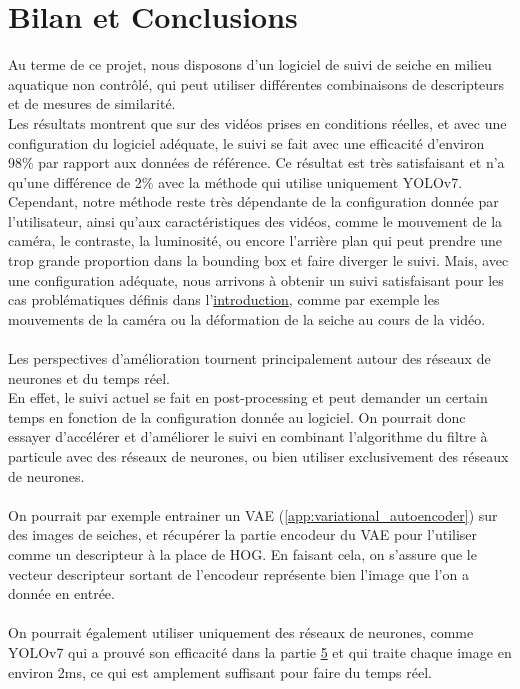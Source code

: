 \pagestyle{plain}
\chapter{Bilan et Conclusions}
Au terme de ce projet, nous disposons d'un logiciel de suivi de seiche en milieu aquatique non contrôlé, qui peut utiliser différentes combinaisons de descripteurs et de mesures de similarité.\\
Les résultats montrent que sur des vidéos prises en conditions réelles, et avec une configuration du logiciel adéquate, le suivi se fait avec une efficacité d'environ 98\% par rapport aux données de référence. Ce résultat est très satisfaisant et n'a qu'une différence de 2\% avec la méthode qui utilise uniquement YOLOv7.\\
Cependant, notre méthode reste très dépendante de la configuration donnée par l'utilisateur, ainsi qu'aux caractéristiques des vidéos, comme le mouvement de la caméra, le contraste, la luminosité, ou encore l'arrière plan qui peut prendre une trop grande proportion dans la bounding box et faire diverger le suivi. Mais, avec une configuration adéquate, nous arrivons à obtenir un suivi satisfaisant pour les cas problématiques définis dans l'\hyperlink{chapter.1}{introduction}, comme par exemple les mouvements de la caméra ou la déformation de la seiche au cours de la vidéo.\\
\\
Les perspectives d'amélioration tournent principalement autour des réseaux de neurones et du temps réel.\\
En effet, le suivi actuel se fait en post-processing et peut demander un certain temps en fonction de la configuration donnée au logiciel. On pourrait donc essayer d'accélérer et d'améliorer le suivi en combinant l'algorithme du filtre à particule avec des réseaux de neurones, ou bien utiliser exclusivement des réseaux de neurones.\\
\\
On pourrait par exemple entrainer un VAE (\ref{app:variational_autoencoder}) sur des images de seiches, et récupérer la partie encodeur du VAE pour l'utiliser comme un descripteur à la place de HOG. En faisant cela, on s'assure que le vecteur descripteur sortant de l'encodeur représente bien l'image que l'on a donnée en entrée.\\
\\
On pourrait également utiliser uniquement des réseaux de neurones, comme YOLOv7 qui a prouvé son efficacité dans la partie \hyperlink{chapter.5}{5} et qui traite chaque image en environ 2ms, ce qui est amplement suffisant pour faire du temps réel.

\clearpage
